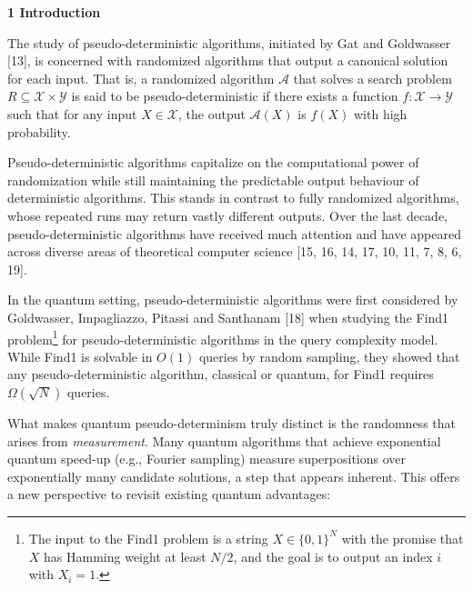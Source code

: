 

\par\medskip\noindent\textbf{
1 Introduction}\par




The study of pseudo-deterministic algorithms, initiated by Gat and Goldwasser [13], is concerned with randomized algorithms that output a canonical solution for each input. That is, a randomized algorithm $\mathcal{A}$ that solves a search problem ${R}\subseteq\mathcal{X}\times\mathcal{Y}$ is said to be pseudo-deterministic if there exists a function $f:\mathcal{X}\rightarrow\mathcal{Y}$ such that for any input $X\in\mathcal{X}$, the output $\mathcal{A}(X)$ is $f(X)$ with high probability.\par




Pseudo-deterministic algorithms capitalize on the computational power of randomization while still maintaining the predictable output behaviour of deterministic algorithms. This stands in contrast to fully randomized algorithms, whose repeated runs may return vastly different outputs.
Over the last decade, pseudo-deterministic algorithms have received much attention and have appeared across diverse areas of theoretical computer science [15, 16, 14, 17, 10, 11, 7, 8, 6, 19].\par




In the quantum setting, pseudo-deterministic algorithms were first considered by Goldwasser, Impagliazzo, Pitassi and Santhanam [18] when studying the Find1 problem\footnote{The input to the Find1 problem is a string $X\in\{0,1\}^{N}$ with the promise that $X$ has Hamming weight at least $N/2$, and the goal is to output an index $i$ with $X_{i}=1$.}
for pseudo-deterministic algorithms in the query complexity model. While Find1 is solvable in $O(1)$ queries by random sampling, they showed that any pseudo-deterministic algorithm, classical or quantum, for Find1 requires ${\Omega}(\sqrt{N})$ queries.\par




What makes quantum pseudo-determinism truly distinct is the randomness that arises from \emph{measurement}.
Many quantum algorithms that achieve exponential quantum speed-up (e.g., Fourier sampling) measure superpositions over exponentially many candidate solutions, a step that appears inherent. This offers a new perspective to revisit existing quantum advantages:\par





